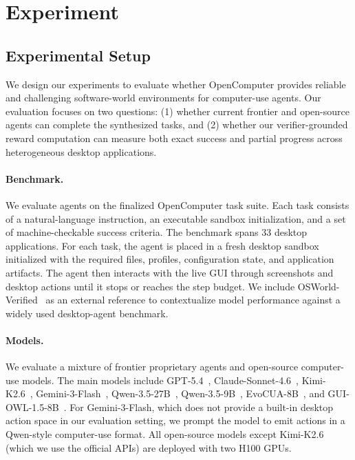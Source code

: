 \section{Experiment}
\label{sec:experiment}
\subsection{Experimental Setup}
\label{sec:experimental-setup}
We design our experiments to evaluate whether OpenComputer provides reliable and challenging
software-world environments for computer-use agents. Our evaluation focuses on two questions:
(1) whether current frontier and open-source agents can complete the synthesized tasks, and
(2) whether our verifier-grounded reward computation can measure both exact success and
partial progress across heterogeneous desktop applications.

\paragraph{Benchmark.}
We evaluate agents on the finalized OpenComputer task suite. Each task consists of a natural-language
instruction, an executable sandbox initialization, and a set of machine-checkable success criteria.
The benchmark spans 33 desktop applications. For each task, the agent is placed in a fresh desktop sandbox initialized with the required files, profiles, configuration state, and application artifacts. The agent then interacts with the live GUI
through screenshots and desktop actions until it stops or reaches the step budget. We include OSWorld-Verified~\citep{xie2024osworld} as an external reference to contextualize model performance against a widely used desktop-agent benchmark.

\paragraph{Models.}
We evaluate a mixture of frontier proprietary agents and open-source computer-use models. The
main models include GPT-5.4~\citep{openai2026gpt54}, Claude-Sonnet-4.6~\citep{anthropic2026sonnet46}, Kimi-K2.6~\citep{moonshot2026kimi26}, Gemini-3-Flash~\citep{google2025gemini3flash}, Qwen-3.5-27B~\citep{qwen2026qwen35},
Qwen-3.5-9B~\citep{qwen2026qwen35}, EvoCUA-8B~\citep{xue2026evocua}, and GUI-OWL-1.5-8B~\citep{xu2026mobile}. For Gemini-3-Flash, which does not
provide a built-in desktop action space in our evaluation setting, we prompt the model to emit actions in a Qwen-style computer-use format. All open-source models except Kimi-K2.6 (which we use the official APIs) are deployed with two H100 GPUs.

